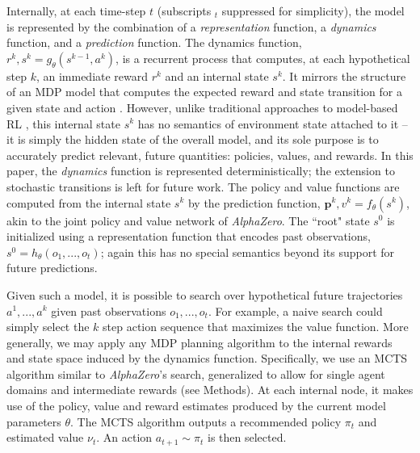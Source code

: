 \documentclass{article}
\newcommand{\alphazero}{\emph{AlphaZero}}
\begin{document}
Internally, at each time-step $t$ (subscripts $_t$ suppressed for simplicity), the model is represented by the combination of a \emph{representation} function, a \emph{dynamics} function, and a \emph{prediction} function. The dynamics function, $r^k, s^k = g_\theta(s^{k-1}, a^k)$, is a recurrent process that computes, at each hypothetical step $k$, an immediate reward $r^k$ and an internal state $s^k$. It mirrors the structure of an MDP model that computes the expected reward and state transition for a given state and action \cite{puterman:MDP}. However, unlike traditional approaches to model-based RL \cite{sutton:book}, this internal state $s^k$ has no semantics of environment state attached to it -- it is simply the hidden state of the overall model, and its sole purpose is to accurately predict relevant, future quantities: policies, values, and rewards. In this paper, the \emph{dynamics} function is represented deterministically; the extension to stochastic transitions is left for future work. The policy and value functions are computed from the internal state $s^k$ by the prediction function, $\mathbf{p}^k, v^k = f_\theta(s^k)$, akin to the joint policy and value network of \alphazero{}. The ``root" state $s^0$ is initialized using a representation function that encodes past observations, $s^0 = h_\theta(o_1, ..., o_t)$; again this has no special semantics beyond its support for future predictions.

Given such a model, it is possible to search over hypothetical future trajectories $a^1, ..., a^k$ given past observations $o_1, ..., o_t$. For example, a naive search could simply select the $k$ step action sequence that maximizes the value function. %
More generally, we may apply any MDP planning algorithm to the internal rewards and state space induced by the dynamics function. Specifically, we use an MCTS algorithm similar to \alphazero{}'s search, generalized to allow for single agent domains and intermediate rewards (see Methods). At each internal node, it makes use of the policy, value and reward estimates produced by the current model parameters $\theta$. The MCTS algorithm outputs a recommended policy $\pi_t$ and estimated value $\nu_t$. An action $a_{t+1} \sim \pi_t$ is then selected.
\end{document}
